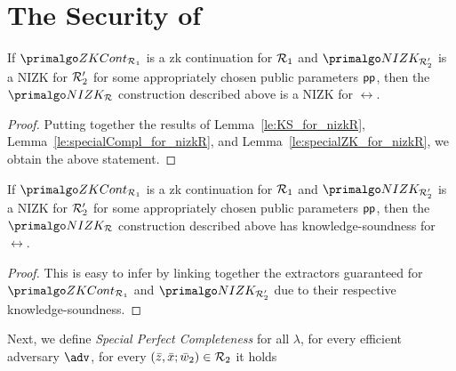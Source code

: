 
\section{The Security of \nizkR}
\label{ap:nizkR}
\begin{theorem}
	If $\ZKCont_{\relone}$ is a zk continuation for $\mathcal{R}_1$ and $\nizktwo$ is a NIZK for $\mathcal{R}_2'$ for some appropriately chosen public parameters $\mathsf{pp}$, 
	then the $\nizkR$ construction described above is a NIZK for $\rel$.
\end{theorem}
\begin{proof} Putting together the results of Lemma~\ref{le:KS_for_nizkR}, Lemma~\ref{le:specialCompl_for_nizkR}, and
	Lemma~\ref{le:specialZK_for_nizkR}, we obtain the above statement.
\end{proof} 
\begin{lemma} 
	\label{le:KS_for_nizkR}
	If $\ZKCont_{\relone}$ is a zk continuation for $\mathcal{R}_1$ and $\nizktwo$ is a NIZK for $\mathcal{R}_2'$ for some appropriately chosen public parameters $\mathsf{pp}$, 
	then the $\nizkR$ construction described above has knowledge-soundness for $\rel$. 
\end{lemma} 
\begin{proof}This is easy to infer by linking together the extractors guaranteed for $\ZKCont_{\relone}$ and $\nizktwo$ due to their respective 
	knowledge-soundness.
\end{proof}
\noindent Next, we define 
\emph{Special Perfect Completeness} for all $\lambda $, for every efficient adversary $\adv$, for every 
$(\bar{z}, \bar{x}; \bar{w}_2) \in \mathcal{R}_2$ it holds
